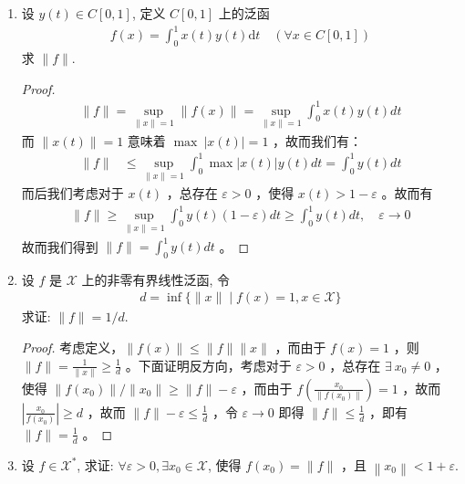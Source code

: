 \begin{enumerate}[leftmargin=2cm, label=\arabic*]
\begin{enumerate}[leftmargin=1cm, label=(\arabic*)]
\begin{proof}
    而我们由这几道题，可以得出 $\sup\limits_{\|x\| < 1} f(x) = \|f\|$ ，考虑 $\|y\| < \delta$ ，则存在对应的 $\|x\| = 1$ ，使得 $y = \frac{x\delta}{\|x\|}$ ，则有 $\sup\limits_{\|y\|<\delta} f(y) = \frac{\delta}{\|x\|} \sup\limits_{\|x\| = 1} f(x) = \delta \|f\|$ 。
\end{proof}
    \end{enumerate}
    \item 设 $y(t) \in C[0,1]$, 定义 $C[0,1]$ 上的泛函
    \begin{align*}
        f(x)=\int_{0}^{1} x(t) y(t) \mathrm{d} t \quad(\forall x \in C[0,1])
    \end{align*}
    求 $\|f\|$.
\begin{proof}
\begin{align*}
    \|f\| = \sup\limits_{\|x\| = 1} \|f(x)\| = \sup\limits_{\|x\| = 1} \int_0^1 x(t)y(t)dt
\end{align*}
而 $\|x(t)\| = 1$ 意味着 $\max\ |x(t)| = 1$ ，故而我们有：
\begin{align*}
    \|f\| &\leqslant \sup\limits_{\|x\| = 1} \int_0^1 \max|x(t)| y(t) dt = \int_0^1 y(t) dt 
\end{align*}
而后我们考虑对于 $x(t)$ ，总存在 $\varepsilon > 0$ ，使得 $x(t) > 1 - \varepsilon$ 。故而有
\begin{align*}
    \|f\| \geqslant \sup\limits_{\|x\| = 1}  \int_0^1 y(t) (1-\varepsilon) dt \geqslant \int_0^1 y(t)dt,\quad \varepsilon \to 0
\end{align*}
故而我们得到 $\|f\| = \int_0^1 y(t) dt$ 。
\end{proof}
    \item 设 $f$ 是 $\mathscr{X}$ 上的非零有界线性泛函, 令
    \begin{align*}
        d =\inf \{\|x\| \mid f(x)=1, x \in \mathscr{X}\}
    \end{align*}
    求证: $\|f\|=1 / d$.
\begin{proof}
    考虑定义，$\|f(x)\| \leqslant \|f\|\|x\|$ ，而由于 $f(x) = 1$ ，则 $\|f\| = \frac{1}{\|x\|} \geqslant \frac{1}{d}$ 。下面证明反方向，考虑对于 $\varepsilon > 0$ ，总存在 $\exists\ x_0 \neq 0$ ，使得 $\|f(x_0)\| / \|x_0\| \geqslant \|f\| - \varepsilon$ ，而由于 $f\left(\frac{x_0}{\|f(x_0)\|}\right) = 1$ ，故而 $\left|\frac{x_0}{f(x_0)}\right| \geqslant d$ ，故而 $\|f\| - \varepsilon \leqslant \frac{1}{d}$ ，令 $\varepsilon\to 0$ 即得 $\|f\| \leqslant \frac{1}{d}$ ，即有 $\|f\| = \frac{1}{d}$ 。 
\end{proof}
    \item 设 $f \in \mathscr{X}^{*}$, 求证: $\forall \varepsilon>0, \exists x_{0} \in \mathscr{X}$, 使得 $f\left(x_{0}\right)=\|f\|$ ，且 $\left\|x_{0}\right\|<1+\varepsilon$.

\end{enumerate}
